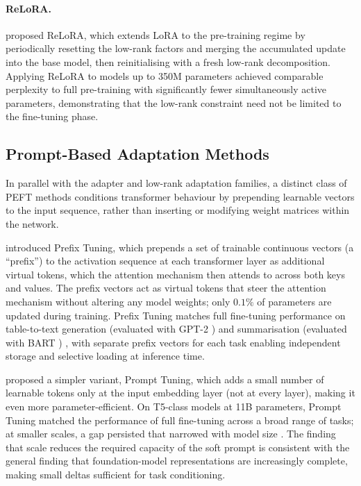 \paragraph{ReLoRA.}
\citet{LialinReLoRA2023} proposed ReLoRA, which extends LoRA to the pre-training regime
by periodically resetting the low-rank factors and merging the accumulated update into the
base model, then reinitialising with a fresh low-rank decomposition. Applying ReLoRA to
models up to 350M parameters achieved comparable perplexity to full pre-training with
significantly fewer simultaneously active parameters, demonstrating that the low-rank
constraint need not be limited to the fine-tuning phase.

\subsection{Prompt-Based Adaptation Methods}
\label{sec:peft:prompt}

In parallel with the adapter and low-rank adaptation families, a distinct class of PEFT
methods conditions transformer behaviour by prepending learnable vectors to the input
sequence, rather than inserting or modifying weight matrices within the network.

\citet{LiLiang2021} introduced Prefix Tuning, which prepends a set of trainable
continuous vectors (a ``prefix'') to the activation sequence at each transformer
layer as additional virtual tokens, which the attention mechanism then attends to across
both keys and values. The prefix vectors act as virtual tokens that steer the attention
mechanism without
altering any model weights; only $0.1\%$ of parameters are updated during training.
Prefix Tuning matches full fine-tuning performance on
table-to-text generation (evaluated with GPT-2 \citep{RadfordGPT22019}) and summarisation (evaluated with BART \citep{LewisBART2020})
\citep{LiLiang2021}, with separate prefix vectors for each task enabling independent
storage and selective loading at inference time.

\citet{Lester2021} proposed a simpler variant, Prompt Tuning, which adds a small number
of learnable tokens only at the input embedding layer (not at every layer), making it
even more parameter-efficient. On T5-class models \citep{RaffelT52020} at 11B parameters, Prompt Tuning
matched the performance of full fine-tuning across a broad range of tasks; at smaller
scales, a gap persisted that narrowed with model size \citep{Lester2021}. The finding
that scale reduces the required capacity of the soft prompt is consistent with the general
finding that foundation-model representations are increasingly complete, making small
deltas sufficient for task conditioning.

